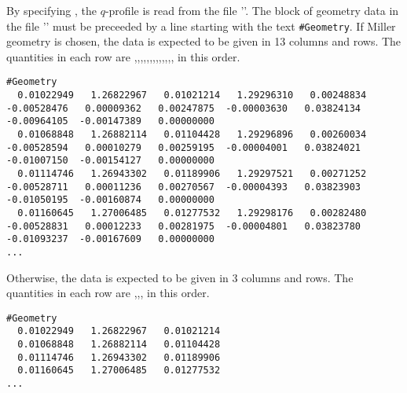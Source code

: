 By specifying , the $q$-profile is read from the file ''.
The block of geometry data in the file '' must be preceeded by a line starting with the text \verb|#Geometry|.
If Miller geometry is chosen, the data is expected to be given in 13 columns and  rows.
The quantities in each row are ,,,,,,,,,,,,, in this order.
\begin{verbatim}
#Geometry
  0.01022949   1.26822967   0.01021214   1.29296310   0.00248834  -0.00528476   0.00009362   0.00247875  -0.00003630   0.03824134  -0.00964105  -0.00147389   0.00000000
  0.01068848   1.26882114   0.01104428   1.29296896   0.00260034  -0.00528594   0.00010279   0.00259195  -0.00004001   0.03824021  -0.01007150  -0.00154127   0.00000000
  0.01114746   1.26943302   0.01189906   1.29297521   0.00271252  -0.00528711   0.00011236   0.00270567  -0.00004393   0.03823903  -0.01050195  -0.00160874   0.00000000
  0.01160645   1.27006485   0.01277532   1.29298176   0.00282480  -0.00528831   0.00012233   0.00281975  -0.00004801   0.03823780  -0.01093237  -0.00167609   0.00000000
...
\end{verbatim}
Otherwise, the data is expected to be given in 3 columns and  rows.
The quantities in each row are ,,, in this order.
\begin{verbatim}
#Geometry
  0.01022949   1.26822967   0.01021214
  0.01068848   1.26882114   0.01104428
  0.01114746   1.26943302   0.01189906
  0.01160645   1.27006485   0.01277532
...
\end{verbatim}




